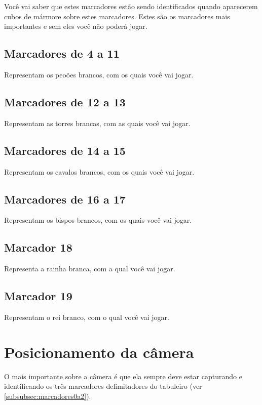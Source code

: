 \documentclass[a4paper,12pt]{book}
\begin{document}
        Voc\^e vai saber que estes marcadores est\~ao sendo identificados quando aparecerem cubos de m\'armore sobre estes marcadores. Estes s\~ao os marcadores mais importantes e sem eles voc\^e n\~ao poder\'a jogar.

        \subsection{Marcadores de 4 a 11}
        \label{subsubsec:marcadores4a11}
        Representam os peo\~oes brancos, com os quais voc\^e vai jogar.

        \subsection{Marcadores de 12 a 13}
        \label{subsubsec:marcadores12a13}
        Representam as torres brancas, com as quais voc\^e vai jogar.

        \subsection{Marcadores de 14 a 15}
        \label{subsubsec:marcadores14a15}
        Representam os cavalos brancos, com os quais voc\^e vai jogar.
 
        \subsection{Marcadores de 16 a 17}
        \label{subsubsec:marcadores16a17}
        Representam os bispos brancos, com os quais voc\^e vai jogar.

        \subsection{Marcador 18}
        \label{subsubsec:marcador18}
        Representa a rainha branca, com a qual voc\^e vai jogar.

        \subsection{Marcador 19}
        \label{subsubsec:marcador19}
        Representam o rei branco, com o qual voc\^e vai jogar.

    \section{Posicionamento da c\^amera}
    \label{sec:posicionamentodacamera}
    O mais importante sobre a c\^amera \'e que ela sempre deve estar capturando e identificando os tr\^es marcadores delimitadores do tabuleiro (ver \ref{subsubsec:marcadores0a2}).
\end{document}
